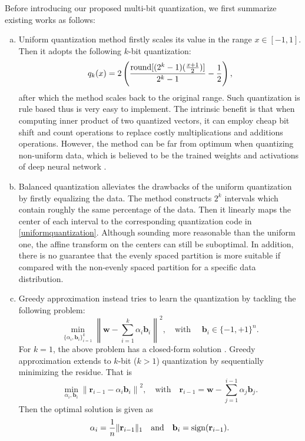 \documentclass{article} %
\newcommand{\dr}{\mathbf{r}}
\newcommand{\w}{\mathbf{w}}
\renewcommand{\b}{\mathbf{b}}
\newcommand{\<}{\left\langle}
\renewcommand{\>}{\right\rangle}
\begin{document}
Before introducing our proposed multi-bit quantization, we first summarize existing works as follows:
\begin{enumerate}[(a)]
	\item Uniform quantization method \citep{xnor,qnn} firstly scales its value in the range $x \in [-1,1]$. Then it adopts the following $k$-bit quantization:
	\begin{equation} \label{uniformquantization}
	q_k(x)=2\left(\frac{{\rm round}[(2^{k}-1)(\frac{x+1}{2})]}{2^{k}-1}-\frac{1}{2}\right),
	\end{equation}
	 after which the method scales back to the original range. Such quantization is rule based thus is very easy to implement. The intrinsic benefit is that when computing inner product of two quantized vectors, it can employ cheap bit shift and count operations to replace costly multiplications and additions operations. However, the method can be far from optimum when quantizing non-uniform data, which is believed to be the trained weights and activations of deep neural network \citep{balanced}. 
	
	\item Balanced quantization \citep{balanced} alleviates the drawbacks of the uniform quantization by firstly equalizing the data.  The method constructs $2^k$ intervals which contain roughly the same percentage of the data. Then it linearly maps the center of each interval to the corresponding quantization code in \eqref{uniformquantization}. Although sounding more reasonable than the uniform one, the affine transform on the centers can still be suboptimal. In addition,  there is no guarantee that the evenly spaced partition is more suitable if compared with the non-evenly spaced partition for a specific data distribution.  
 
	\item  Greedy approximation \citep{refinedgreedy} instead tries to learn the quantization by tackling the following problem:
	\begin{equation} \label{kbitweight}
	\min_{\{\alpha_i, \b_i\}_{i=1}^k} \left\|\w -  \sum_{i=1}^{k} \alpha_i \b_i \right\|^2, \quad \text{with }\quad  \b_i \in \{ -1, +1\}^{n}.
	\end{equation}
	For $k=1$, the above problem has a closed-form solution \citep{xnor}. Greedy approximation extends to $k$-bit ($k> 1$) quantization by sequentially minimizing the residue. That is 
	\begin{equation} \label{sequential}
		   \min_{\alpha_i, \b_i} \left\|\dr_{i-1} - \alpha_i \b_i \right\|^2, \quad \text{with} \quad \dr_{i-1} = \w - \sum_{j=1}^{i-1} \alpha_j \b_j.
	   \end{equation}
	   Then the optimal solution is given as
	   \begin{equation}\label{solution}
	   \alpha_i = \frac{1}{n}\|\dr_{i-1}\|_1 \quad \text{and} \quad \b_i = {\rm sign}(\dr_{i-1}).
	   \end{equation} 
	    

\end{enumerate}
\end{document}

